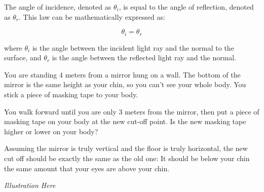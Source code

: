\begin{mdframed}[style=important, frametitle={Law of Reflection}]
  The angle of incidence, denoted as $\theta_i$, is equal to
  the angle of reflection, denoted as $\theta_r$. This law can be
  mathematically expressed as:

  $$\theta_i = \theta_r$$

  where $\theta_i$ is the angle between the incident light ray and the
  normal to the surface, and $\theta_r$ is the angle between the
  reflected light ray and the normal.



\end{mdframed}

\begin{Exercise}[title={Law of Reflection}, label=law_of_reflection]

  You are standing 4 meters from a mirror hung on a wall. The bottom
  of the mirror is the same height as your chin, so you can't see your
  whole body. You stick a piece of masking tape to your body.

  You walk forward until you are only 3 meters from the mirror, then
  put a piece of masking tape on your body at the new cut-off point. Is the new
  masking tape higher or lower on your body?

\end{Exercise}
\begin{Answer}[ref=law_of_reflection]

  Assuming the mirror is truly vertical and the floor is truly
  horizontal, the new cut off should be exactly the same as the old
  one: It should be below your chin the same amount that your eyes are
  above your chin.

  \textit{Illustration Here}

\end{Answer}

